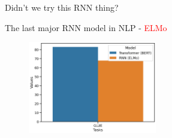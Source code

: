 \begin{frame}{Didn't we try this RNN thing?  }

\begin{center}    
The last major RNN model in NLP - \textcolor{red}{ELMo}
\end{center}

\pause

    \begin{figure}
        \centering
        \includegraphics[width=0.5\textwidth]{Figs/GLUE.png}

        \label{fig:my_label}
    \end{figure}
\end{frame}

